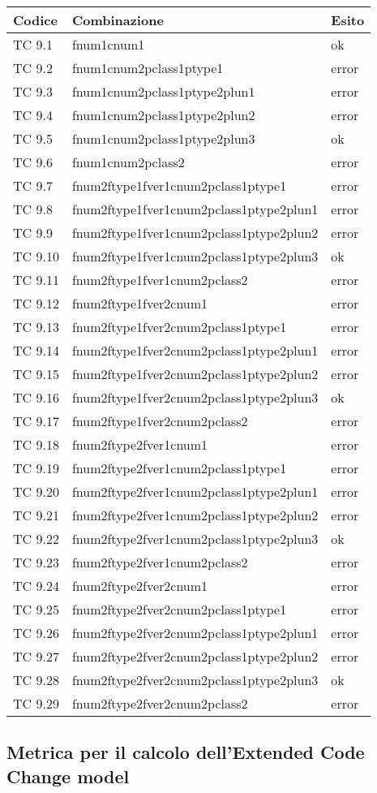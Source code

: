 \begin{longtable}{|p{3cm}|p{7cm}|p{3cm}|}
	\hline
	\rowcolor{Gray}
	\textbf{Codice} & \textbf{Combinazione} & \textbf{Esito}\tabularnewline
	\hline
	TC 9.1			& fnum1cnum1					& ok \tabularnewline
	\hline
	TC 9.2			& fnum1cnum2pclass1ptype1			& error \tabularnewline
	\hline
	TC 9.3			& fnum1cnum2pclass1ptype2plun1			& error \tabularnewline
	\hline
	TC 9.4			& fnum1cnum2pclass1ptype2plun2			& error \tabularnewline
	\hline
	TC 9.5			& fnum1cnum2pclass1ptype2plun3			& ok \tabularnewline
	\hline
	TC 9.6			& fnum1cnum2pclass2				& error \tabularnewline
	\hline
	TC 9.7			& fnum2ftype1fver1cnum2pclass1ptype1		& error \tabularnewline
	\hline
	TC 9.8			& fnum2ftype1fver1cnum2pclass1ptype2plun1	& error \tabularnewline
	\hline
	TC 9.9			& fnum2ftype1fver1cnum2pclass1ptype2plun2	& error \tabularnewline
	\hline
	TC 9.10			& fnum2ftype1fver1cnum2pclass1ptype2plun3	& ok \tabularnewline
	\hline
	TC 9.11			& fnum2ftype1fver1cnum2pclass2			& error \tabularnewline
	\hline
	TC 9.12			& fnum2ftype1fver2cnum1				& error \tabularnewline
	\hline
	TC 9.13			& fnum2ftype1fver2cnum2pclass1ptype1		& error \tabularnewline
	\hline
	TC 9.14			& fnum2ftype1fver2cnum2pclass1ptype2plun1	& error \tabularnewline
	\hline
	TC 9.15			& fnum2ftype1fver2cnum2pclass1ptype2plun2	& error \tabularnewline
	\hline
	TC 9.16			& fnum2ftype1fver2cnum2pclass1ptype2plun3	& ok \tabularnewline
	\hline
	TC 9.17			& fnum2ftype1fver2cnum2pclass2			& error \tabularnewline
	\hline
	TC 9.18			& fnum2ftype2fver1cnum1				& error \tabularnewline
	\hline
	TC 9.19			& fnum2ftype2fver1cnum2pclass1ptype1		& error \tabularnewline
	\hline
	TC 9.20			& fnum2ftype2fver1cnum2pclass1ptype2plun1	& error \tabularnewline
	\hline
	TC 9.21			& fnum2ftype2fver1cnum2pclass1ptype2plun2	& error \tabularnewline
	\hline
	TC 9.22			& fnum2ftype2fver1cnum2pclass1ptype2plun3	& ok \tabularnewline
	\hline
	TC 9.23			& fnum2ftype2fver1cnum2pclass2			& error \tabularnewline
	\hline
	TC 9.24			& fnum2ftype2fver2cnum1				& error \tabularnewline
	\hline
	TC 9.25			& fnum2ftype2fver2cnum2pclass1ptype1		& error \tabularnewline
	\hline
	TC 9.26			& fnum2ftype2fver2cnum2pclass1ptype2plun1	& error \tabularnewline
	\hline
	TC 9.27			& fnum2ftype2fver2cnum2pclass1ptype2plun2	& error \tabularnewline
	\hline
	TC 9.28			& fnum2ftype2fver2cnum2pclass1ptype2plun3	& ok \tabularnewline
	\hline
	TC 9.29			& fnum2ftype2fver2cnum2pclass2			& error \tabularnewline
	\hline
\end{longtable}
\clearpage



\subsection{Metrica per il calcolo dell'Extended Code Change model}

